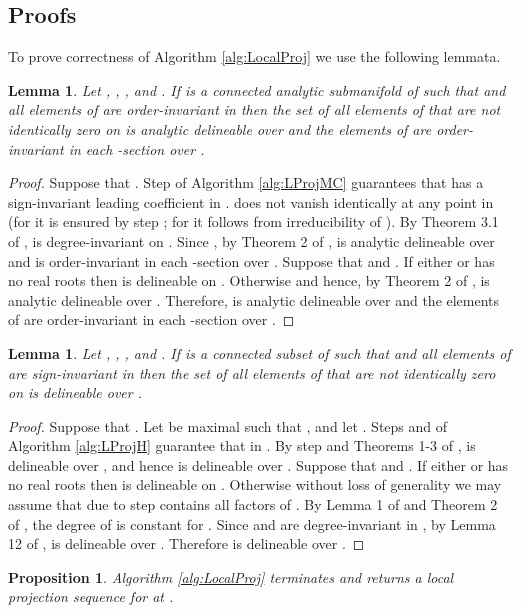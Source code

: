 \documentclass[english]{amsart}
\numberwithin{equation}{section}
\numberwithin{figure}{section}
\newtheorem{lem}[thm]{Lemma}
\newtheorem{prop}[thm]{Proposition}
\begin{document}
\subsection{Proofs}

To prove correctness of Algorithm \ref{alg:LocalProj} we use the
following lemmata.
\begin{lem}
\label{lem:LProjMC}Let\emph{ }\textup{\emph{,}} \emph{,
}\emph{, }\textup{\emph{and
. If  is}} a connected analytic submanifold
of  such that  and all elements
of  are order-invariant in  then the set  of all elements
of  that are not identically zero on  is analytic
delineable over  and the elements of  are order-invariant
in each -section over . \end{lem}
\begin{proof}
Suppose that . Step  of Algorithm \ref{alg:LProjMC}
guarantees that  has a sign-invariant leading coefficient in .
 does not vanish identically at any point in  (for 
it is ensured by step ; for  it follows from irreducibility
of ). By Theorem 3.1 of \cite{B},  is degree-invariant on
. Since , by Theorem 2 of \cite{MC2},
 is analytic delineable over  and is order-invariant in
each -section over . Suppose that  and .
If either  or  has no real
roots then  is delineable on . Otherwise 
and hence, by Theorem 2 of \cite{MC2},  is analytic delineable
over . Therefore,  is analytic delineable over  and
the elements of  are order-invariant in each -section
over . \end{proof}
\begin{lem}
\label{lem:LProjH}Let\emph{ }\textup{\emph{,}} \emph{,
}\emph{, }\textup{\emph{and
. If  is}} a connected subset of 
such that  and all elements of  are sign-invariant
in  then the set  of all elements of  that are not
identically zero on  is delineable over . \end{lem}
\begin{proof}
Suppose that . Let 
be maximal such that , and let .
Steps  and  of Algorithm \ref{alg:LProjH} guarantee
that  in . By step  and Theorems
1-3 of \cite{C},  is delineable over , and hence
 is delineable over . Suppose that  and .
If either  or  has no real
roots then  is delineable on . Otherwise without loss
of generality we may assume that due to step   contains
all factors of . By Lemma 1 of \cite{H}
and Theorem 2 of \cite{C}, the degree of 
is constant for . Since  and  are degree-invariant
in , by Lemma 12 of \cite{S9},  is delineable over
. Therefore  is delineable over . \end{proof}
\begin{prop}
\label{pro:LocalProj}Algorithm \ref{alg:LocalProj} terminates and
returns a local projection sequence for  at .\textup{\emph{ }}\end{prop}
\end{document}
